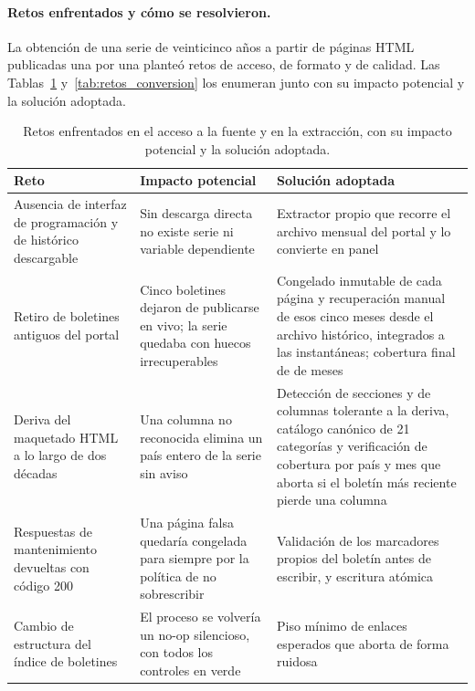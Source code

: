 \documentclass[12pt,letterpaper]{report}
\begin{document}
\paragraph{Retos enfrentados y cómo se resolvieron.} La obtención de una serie de
veinticinco años a partir de páginas HTML publicadas una por una planteó retos de acceso,
de formato y de calidad. Las Tablas~\ref{tab:retos_acceso} y~\ref{tab:retos_conversion} los
enumeran junto con su impacto potencial y la solución adoptada.

\begin{table}[H]
\centering
\footnotesize
\caption[Retos de acceso y extracción]{Retos enfrentados en el acceso a la fuente y en la
extracción, con su impacto potencial y la solución adoptada.}
\label{tab:retos_acceso}
\begin{tabular}{p{3.5cm}p{4.0cm}p{6.0cm}}
\toprule
\rowcolor{uacjblue!15}
\textbf{Reto} & \textbf{Impacto potencial} & \textbf{Solución adoptada} \\ \midrule
Ausencia de interfaz de programación y de histórico descargable & Sin descarga directa no existe serie ni variable dependiente & Extractor propio que recorre el archivo mensual del portal y lo convierte en panel \\
Retiro de boletines antiguos del portal & Cinco boletines dejaron de publicarse en vivo; la serie quedaba con huecos irrecuperables & Congelado inmutable de cada página y recuperación manual de esos cinco meses desde el archivo histórico, integrados a las instantáneas; cobertura final de \factNMonths{} de \factNMonths{} meses \\
Deriva del maquetado HTML a lo largo de dos décadas & Una columna no reconocida elimina un país entero de la serie sin aviso & Detección de secciones y de columnas tolerante a la deriva, catálogo canónico de 21 categorías y verificación de cobertura por país y mes que aborta si el boletín más reciente pierde una columna \\
Respuestas de mantenimiento devueltas con código 200 & Una página falsa quedaría congelada para siempre por la política de no sobrescribir & Validación de los marcadores propios del boletín antes de escribir, y escritura atómica \\
Cambio de estructura del índice de boletines & El proceso se volvería un no-op silencioso, con todos los controles en verde & Piso mínimo de enlaces esperados que aborta de forma ruidosa \\
\bottomrule
\end{tabular}
\end{table}
\end{document}

